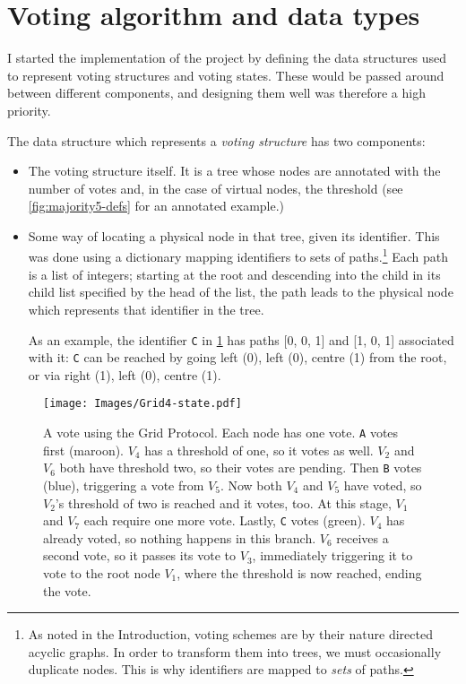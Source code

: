 \documentclass[11pt,chapterprefix=true,toc=bibliography,numbers=noendperiod,
               footnotes=multiple,twoside]{scrreprt}
\begin{document}

\section{Voting algorithm and data types\label{sc:voting-algo}}

I started the implementation of the project by defining the data structures used to represent voting structures and voting states. These would be passed around between different components, and designing them well was therefore a high priority.

The data structure which represents a \emph{voting structure} has two components:

\begin{itemize}
    \item The voting structure itself. It is a tree whose nodes are annotated with the number of votes and, in the case of virtual nodes, the threshold (see \cref{fig:majority5-defs} for an annotated example.)
    \item Some way of locating a physical node in that tree, given its identifier. This was done using a dictionary mapping identifiers to sets of paths.\footnote{As noted in the Introduction, voting schemes are by their nature directed acyclic graphs. In order to transform them into trees, we must occasionally duplicate nodes. This is why identifiers are mapped to \emph{sets} of paths.} Each path is a list of integers; starting at the root and descending into the child in its child list specified by the head of the list, the path leads to the physical node which represents that identifier in the tree.

        As an example, the identifier \texttt{C} in \cref{fig:grid4-state} has paths [0, 0, 1] and [1, 0, 1] associated with it: \texttt{C} can be reached by going left (0), left (0), centre (1) from the root, or via right (1), left (0), centre (1).
\end{itemize}

\begin{figure}[p]
    \centering
    \texttt{[image: Images/Grid4-state.pdf]}
    \caption[A vote using the Grid Protocol]{A vote using the Grid Protocol. Each node has one vote. \texttt{A} votes first (maroon). \(V_4\) has a threshold of one, so it votes as well. \(V_2\) and \(V_6\) both have threshold two, so their votes are pending. Then \texttt{B} votes (blue), triggering a vote from \(V_5\). Now both \(V_4\) and \(V_5\) have voted, so \(V_2\)'s threshold of two is reached and it votes, too. At this stage, \(V_1\) and \(V_7\) each require one more vote. Lastly, \texttt{C} votes (green). \(V_4\) has already voted, so nothing happens in this branch. \(V_6\) receives a second vote, so it passes its vote to \(V_3\), immediately triggering it to vote to the root node \(V_1\), where the threshold is now reached, ending the vote.}
    \label{fig:grid4-state}
\end{figure}
\end{document}
